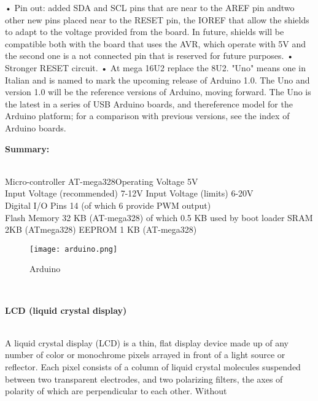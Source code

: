 \documentclass[a4paper,12pt, English]{article}
\begin{document}
\begin{normalsize}
• Pin out: added SDA and SCL pins that are near to the AREF pin andtwo
other new pins placed near to the RESET pin, the IOREF that allow the
shields to adapt to the voltage provided from the board. In future, shields
will be compatible both with the board that uses the AVR, which operate
with 5V and the second one is a not connected pin that is reserved for
future purposes.
\newline
• Stronger RESET circuit.
\newline
• At mega 16U2 replace the 8U2. "Uno" means one in Italian and is named
to mark the upcoming release of Arduino 1.0. The Uno and version 1.0
will be the reference versions of Arduino, moving forward. The Uno is
the latest in a series of USB Arduino boards, and thereference model
for the Arduino platform; for a comparison with previous versions, see the
index of Arduino boards.
\\
\newline
\begin{large}
\textbf{Summary: }
\end{large}\\
 Micro-controller AT-mega328Operating Voltage 5V\\
 Input Voltage (recommended) 7-12V Input Voltage (limits) 6-20V\\
 Digital I/O Pins 14 (of which 6 provide PWM output)\\
 Flash Memory 32 KB (AT-mega328) of which 0.5 KB used by boot
loader SRAM 2KB (ATmega328)
 EEPROM 1 KB (AT-mega328)\\
\begin{figure}[htb]
\begin{center}
\texttt{[image: arduino.png]}
\end{center}
\begin{center}
\renewcommand{\thefigure}{3. 2. 4}
\caption{\footnotesize Arduino }
\end{center}
\end{figure}\\
\newline
\begin{large}
\textbf{LCD (liquid crystal display) }
\end{large}
\\
\tabIn A liquid crystal display (LCD) is a thin, flat display device made up of any number of
color or monochrome pixels arrayed in front of a light source or reflector. Each pixel
consists of a column of liquid crystal molecules suspended between two transparent electrodes,
and two polarizing filters, the axes of polarity of which are perpendicular to each other. Without

\end{normalsize}
\end{document}
